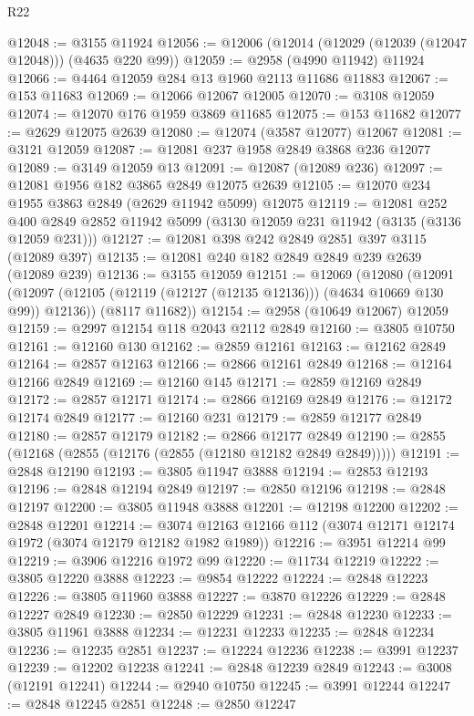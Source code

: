 \begin{lexlean}{R22}
\begin{coremodule}
@12048 := @3155 @11924
@12056 := @12006 (@12014 (@12029 (@12039 (@12047 @12048))) (@4635 @220 @99))
@12059 := @2958 (@4990 @11942) @11924
@12066 := @4464 @12059 @284 @13 @1960 @2113 @11686 @11883
@12067 := @153 @11683
@12069 := @12066 @12067 @12005
@12070 := @3108 @12059
@12074 := @12070 @176 @1959 @3869 @11685
@12075 := @153 @11682
@12077 := @2629 @12075 @2639
@12080 := @12074 (@3587 @12077) @12067
@12081 := @3121 @12059
@12087 := @12081 @237 @1958 @2849 @3868 @236 @12077
@12089 := @3149 @12059 @13
@12091 := @12087 (@12089 @236)
@12097 := @12081 @1956 @182 @3865 @2849 @12075 @2639
@12105 := @12070 @234 @1955 @3863 @2849 (@2629 @11942 @5099) @12075
@12119 := @12081
    @252
    @400
    @2849
    @2852
    @11942
    @5099
    (@3130 @12059 @231 @11942 (@3135 (@3136 @12059 @231)))
@12127 := @12081 @398 @242 @2849 @2851 @397 @3115 (@12089 @397)
@12135 := @12081 @240 @182 @2849 @2849 @239 @2639 (@12089 @239)
@12136 := @3155 @12059
@12151 := @12069
    (@12080
      (@12091 (@12097 (@12105 (@12119 (@12127 (@12135 @12136))) (@4634 @10669 @130 @99)) @12136))
      (@8117 @11682))
@12154 := @2958 (@10649 @12067) @12059
@12159 := @2997 @12154 @118 @2043 @2112 @2849
@12160 := @3805 @10750
@12161 := @12160 @130
@12162 := @2859 @12161
@12163 := @12162 @2849
@12164 := @2857 @12163
@12166 := @2866 @12161 @2849
@12168 := @12164 @12166 @2849
@12169 := @12160 @145
@12171 := @2859 @12169 @2849
@12172 := @2857 @12171
@12174 := @2866 @12169 @2849
@12176 := @12172 @12174 @2849
@12177 := @12160 @231
@12179 := @2859 @12177 @2849
@12180 := @2857 @12179
@12182 := @2866 @12177 @2849
@12190 := @2855 (@12168 (@2855 (@12176 (@2855 (@12180 @12182 @2849 @2849)))))
@12191 := @2848 @12190
@12193 := @3805 @11947 @3888
@12194 := @2853 @12193
@12196 := @2848 @12194 @2849
@12197 := @2850 @12196
@12198 := @2848 @12197
@12200 := @3805 @11948 @3888
@12201 := @12198 @12200
@12202 := @2848 @12201
@12214 := @3074 @12163 @12166 @112 (@3074 @12171 @12174 @1972 (@3074 @12179 @12182 @1982 @1989))
@12216 := @3951 @12214 @99
@12219 := @3906 @12216 @1972 @99
@12220 := @11734 @12219
@12222 := @3805 @12220 @3888
@12223 := @9854 @12222
@12224 := @2848 @12223
@12226 := @3805 @11960 @3888
@12227 := @3870 @12226
@12229 := @2848 @12227 @2849
@12230 := @2850 @12229
@12231 := @2848 @12230
@12233 := @3805 @11961 @3888
@12234 := @12231 @12233
@12235 := @2848 @12234
@12236 := @12235 @2851
@12237 := @12224 @12236
@12238 := @3991 @12237
@12239 := @12202 @12238
@12241 := @2848 @12239 @2849
@12243 := @3008 (@12191 @12241)
@12244 := @2940 @10750
@12245 := @3991 @12244
@12247 := @2848 @12245 @2851
@12248 := @2850 @12247

\end{coremodule}
\end{lexlean}
